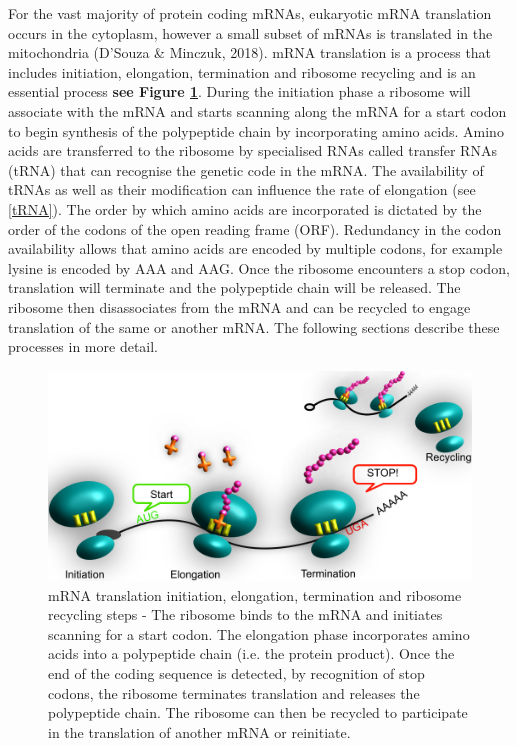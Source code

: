 \documentclass[
  12pt,
  openany]{book}
\begin{document}
For the vast majority of protein coding mRNAs, eukaryotic mRNA translation occurs in the cytoplasm, however a small subset of mRNAs is translated in the mitochondria (D'Souza \& Minczuk, 2018). mRNA translation is a process that includes initiation, elongation, termination and ribosome recycling and is an essential process \textbf{see Figure \ref{fig:doodlemRNASteps}}. During the initiation phase a ribosome will associate with the mRNA and starts scanning along the mRNA for a start codon to begin synthesis of the polypeptide chain by incorporating amino acids. Amino acids are transferred to the ribosome by specialised RNAs called transfer RNAs (tRNA) that can recognise the genetic code in the mRNA. The availability of tRNAs as well as their modification can influence the rate of elongation (see \ref{tRNA}). The order by which amino acids are incorporated is dictated by the order of the codons of the open reading frame (ORF). Redundancy in the codon availability allows that amino acids are encoded by multiple codons, for example lysine is encoded by AAA and AAG. Once the ribosome encounters a stop codon, translation will terminate and the polypeptide chain will be released. The ribosome then disassociates from the mRNA and can be recycled to engage translation of the same or another mRNA. The following sections describe these processes in more detail.

\begin{figure}
  \includegraphics{./figures/doodleTranslation.pdf}
  \caption{mRNA translation initiation, elongation, termination and ribosome recycling steps - The ribosome binds to the mRNA and initiates scanning for a start codon. The elongation phase incorporates amino acids into a polypeptide chain (i.e. the protein product). Once the end of the coding sequence is detected, by recognition of stop codons, the ribosome terminates translation and releases the polypeptide chain. The ribosome can then be recycled to participate in the translation of another mRNA or reinitiate. \label{fig:doodlemRNASteps}}
\end{figure}
\clearpage
\end{document}
